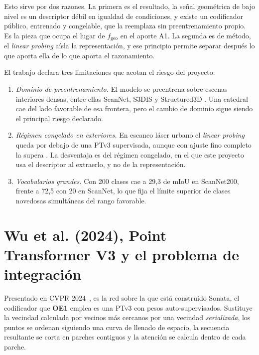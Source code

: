 Esto sirve por dos razones. La primera es el resultado, la señal geométrica de
bajo nivel es un descriptor débil en igualdad de condiciones, y existe un
codificador público, entrenado y congelable, que la reemplaza sin
preentrenamiento propio. Es la pieza que ocupa el lugar de $f_{\text{geo}}$ en el
aporte A1. La segunda es de método, el \emph{linear probing} aísla la
representación, y ese principio permite separar después lo que aporta ella de lo
que aporta el razonamiento.

El trabajo declara tres limitaciones que acotan el riesgo del proyecto.

\begin{enumerate}
\item \textit{Dominio de preentrenamiento.} El modelo se preentrena sobre escenas
interiores densas, entre ellas ScanNet, S3DIS y Structured3D
\cite{wu2025sonata}. Una catedral cae del lado favorable de esa frontera, pero el
cambio de dominio sigue siendo el principal riesgo declarado.

\item \textit{Régimen congelado en exteriores.} En escaneo láser urbano el
\emph{linear probing} queda por debajo de una PTv3 supervisada, aunque con ajuste
fino completo la supera \cite[Tabla~8]{wu2025sonata}. La desventaja es del
régimen congelado, en el que este proyecto usa el descriptor al extraerlo, y no de la representación.

\item \textit{Vocabularios grandes.} Con 200 clases cae a 29,3 de mIoU en
ScanNet200, frente a 72,5 con 20 en ScanNet, lo que fija el límite superior de
clases novedosas simultáneas del rango favorable.
\end{enumerate}

\section[Point Transformer V3]{Wu et al. (2024), Point Transformer V3 y el
problema de integración}
\label{sec:ptv3}

Presentado en CVPR 2024~\cite{wu2024ptv3}, es la red sobre la que está construido
Sonata, el codificador que \textbf{OE1} emplea es una PTv3 con pesos
auto-supervisados. Sustituye la vecindad calculada por vecinos más cercanos por
una vecindad \emph{serializada}, los puntos se ordenan siguiendo una curva de
llenado de espacio, la secuencia resultante se corta en parches contiguos y la
atención se calcula dentro de cada parche.

